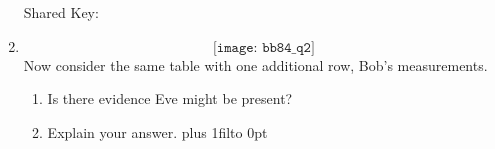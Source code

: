 \documentclass[12pt]{article}
\def\DefaultSpace{1in}
\newcommand{\LeaveSpace}[1][\DefaultSpace]{%
\vskip #1 plus 1fil\relax\hbox to 0pt{\hss} %
}
\begin{document}
\begin{enumerate}[font=\bfseries]
    Shared Key: \Blank[12em]{}
    \item {}
    \[\texttt{[image: bb84\_q2]}\]
    Now consider the same table with one additional row, Bob's measurements.
    \begin{enumerate}[label=\theenumi.\arabic*]
    \item Is there evidence Eve might be present? \Blank{} 
    \item Explain your answer. \LeaveSpace[1.0in]
    \end{enumerate}

\end{enumerate}
\end{document}
